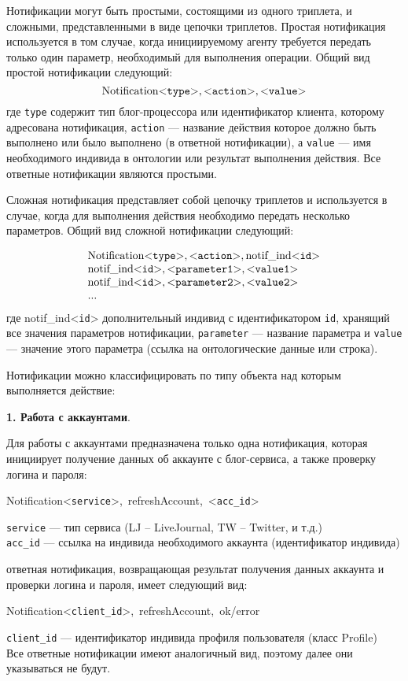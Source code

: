 Нотификации могут быть простыми, состоящими из одного триплета, и сложными, представленными в виде цепочки триплетов. Простая нотификация используется в том случае, когда инициируемому агенту требуется передать только один параметр, необходимый для выполнения операции. Общий вид простой нотификации следующий:
$$
\mathrm{Notification} \mbox{<{\tt type}>}, \mbox{<{\tt action}>}, \mbox{<{\tt value}>}
$$
где {\tt type} содержит тип блог-процессора или идентификатор клиента, которому адресована нотификация, {\tt action} --- название действия которое должно быть выполнено или было выполнено (в ответной нотификации), а {\tt value} --- имя необходимого индивида в онтологии или результат выполнения действия. Все ответные нотификации являются простыми.

Сложная нотификация представляет собой цепочку триплетов и используется в случае, когда для выполнения действия необходимо передать несколько параметров. Общий вид сложной нотификации следующий:

$$
\begin{array}{l}
\mbox{Notification} \mbox{<{\tt type}>}, \mbox{<{\tt action}>}, \mbox{notif\_ind<{\tt id}>} \\
\mbox{notif\_ind<{\tt id}>}, \mbox{<{\tt parameter1}>}, \mbox{<{\tt value1}>}\\
\mbox{notif\_ind<{\tt id}>}, \mbox{<{\tt parameter2}>}, \mbox{<{\tt value2}>}\\
...
\end{array}
$$
где \mbox{notif\_ind<{\tt id}>} дополнительный индивид с идентификатором {\tt id}, хранящий все значения параметров нотификации, {\tt parameter} --- название параметра и {\tt value} --- значение этого параметра (ссылка на онтологические данные или строка).

Нотификации можно классифицировать по типу объекта над которым выполняется действие: %

{\bf 1. Работа с аккаунтами}.
\vspace{-0.25cm}
\begin{list}{}{}
\item
Для работы с аккаунтами предназначена только одна нотификация, которая инициирует получение данных об аккаунте с блог-сервиса, а также проверку логина и пароля:

\mbox{Notification<{\tt service}>, refreshAccount, <{\tt acc\_id}>}

{\tt service} --- тип сервиса (LJ -- LiveJournal, TW -- Twitter, и т.д.)\\
{\tt acc\_id} --- ссылка на индивида необходимого аккаунта (идентификатор индивида)

ответная нотификация, возвращающая результат получения данных аккаунта и проверки логина и пароля, имеет следующий вид:

\mbox{Notification<{\tt client\_id}>, refreshAccount, ok/error}

{\tt client\_id} --- идентификатор индивида профиля пользователя (класс Profile)\\
Все ответные нотификации имеют аналогичный вид, поэтому далее они указываться не будут.
\end{list}

